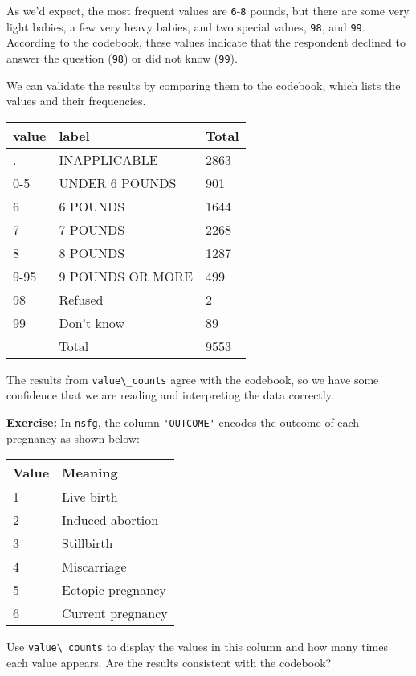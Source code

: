 As we'd expect, the most frequent values are
\passthrough{\lstinline!6!}-\passthrough{\lstinline!8!} pounds, but
there are some very light babies, a few very heavy babies, and two
special values, \passthrough{\lstinline!98!}, and
\passthrough{\lstinline!99!}. According to the codebook, these values
indicate that the respondent declined to answer the question
(\passthrough{\lstinline!98!}) or did not know
(\passthrough{\lstinline!99!}).

We can validate the results by comparing them to the codebook, which
lists the values and their frequencies.

\begin{longtable}[]{@{}lll@{}}
\midrule()
value & label & Total \\
\midrule()
\endhead
. & INAPPLICABLE & 2863 \\
0-5 & UNDER 6 POUNDS & 901 \\
6 & 6 POUNDS & 1644 \\
7 & 7 POUNDS & 2268 \\
8 & 8 POUNDS & 1287 \\
9-95 & 9 POUNDS OR MORE & 499 \\
98 & Refused & 2 \\
99 & Don't know & 89 \\
& Total & 9553 \\
\midrule()
\end{longtable}

The results from \passthrough{\lstinline!value\_counts!} agree with the
codebook, so we have some confidence that we are reading and
interpreting the data correctly.

\textbf{Exercise:} In \passthrough{\lstinline!nsfg!}, the column
\passthrough{\lstinline!'OUTCOME'!} encodes the outcome of each
pregnancy as shown below:

\begin{longtable}[]{@{}ll@{}}
\midrule()
Value & Meaning \\
\midrule()
\endhead
1 & Live birth \\
2 & Induced abortion \\
3 & Stillbirth \\
4 & Miscarriage \\
5 & Ectopic pregnancy \\
6 & Current pregnancy \\
\midrule()
\end{longtable}

Use \passthrough{\lstinline!value\_counts!} to display the values in
this column and how many times each value appears. Are the results
consistent with the codebook?

